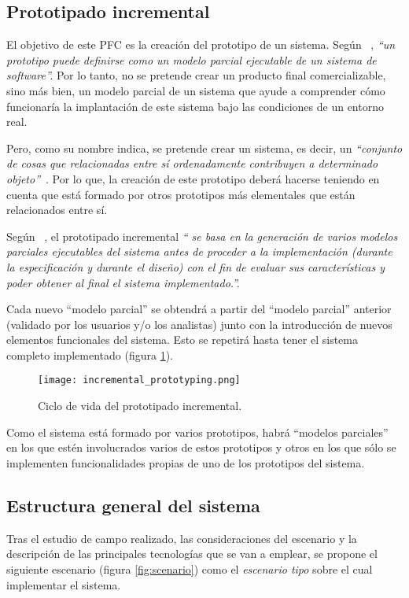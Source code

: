  \subsection{Prototipado incremental}
El objetivo de este \acs{PFC} es la creación del prototipo de un sistema.
Según ~\cite{bib:software_engineering}, \emph{``un prototipo puede definirse
como  un modelo parcial ejecutable de un sistema de software''.} Por lo tanto, 
no se pretende crear un producto final comercializable, sino más bien, un
modelo parcial de un sistema que ayude a comprender cómo funcionaría la
implantación de este sistema bajo las condiciones de un entorno real.

Pero, como su nombre indica, se pretende crear un sistema, es decir, un
\emph{``conjunto de cosas que relacionadas entre sí ordenadamente contribuyen 
a determinado objeto''}~\cite{bib:rae}. Por lo que, la creación de este 
prototipo deberá hacerse teniendo en cuenta que está formado por otros 
prototipos más elementales que están relacionados entre sí.

Según ~\cite{bib:software_engineering}, el prototipado incremental \emph{``
se basa en la generación de varios modelos parciales ejecutables del sistema 
antes de proceder a la implementación (durante la especificación y durante el 
diseño) con el fin de evaluar sus características y poder obtener al final el 
sistema implementado.''.}

Cada nuevo ``modelo parcial'' se obtendrá a partir del ``modelo parcial''
anterior (validado por los usuarios y/o los analistas) junto con la
introducción de nuevos elementos funcionales del sistema. Esto se repetirá
hasta tener el sistema completo implementado (figura
\ref{fig:incremental_prototyping}).

\begin{figure}[!h]
  \begin{center}
    \texttt{[image: incremental\_prototyping.png]}
    \caption{Ciclo de vida del prototipado incremental.}
    \label{fig:incremental_prototyping}
  \end{center}
\end{figure}

Como el sistema está formado por varios prototipos, habrá ``modelos parciales''
en los que estén involucrados varios de estos prototipos y otros en los que
sólo se implementen funcionalidades propias de uno de los prototipos del
sistema.

  \subsection{Estructura general del sistema}
Tras el estudio de campo realizado, las consideraciones del escenario y la
descripción de las principales tecnologías que se van a emplear, se propone
el siguiente escenario (figura \ref{fig:scenario}) como el \emph{escenario
tipo} sobre el cual implementar el sistema.

